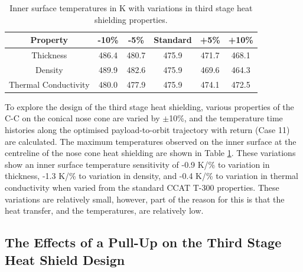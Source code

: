 \begin{table}[!ht]
	\centering
	\begin{tabular}{|c|c|c|c|c|c|}
		\hline Property & -10\% & -5\% & Standard & +5\% & +10\% \\ 
		\hline Thickness & 486.4 & 480.7 & 475.9 &  471.7 & 468.1  \\ 
		\hline Density &  489.9 & 482.6 & 475.9 & 469.6 &  464.3\\ 
		\hline Thermal Conductivity & 480.0 & 477.9 & 475.9 & 474.1 & 472.5 \\ 
		\hline 
	\end{tabular} 
	
	\caption{Inner surface temperatures in K with variations in third stage heat shielding properties.}
	\label{tab:tpsthirdstage}
\end{table}

To explore the design of the third stage heat shielding, various properties of the C-C on the conical nose cone are varied by $\pm$10\%, and the temperature time histories along the optimised payload-to-orbit trajectory with return (Case 11) are calculated. The maximum temperatures observed on the inner surface at the centreline of the nose cone heat shielding are shown in Table \ref{tab:tpsthirdstage}. These variations show an inner surface temperature sensitivity of -0.9 K/\% to variation in thickness, -1.3 K/\% to variation in density, and -0.4 K/\% to variation in thermal conductivity when varied from the standard CCAT T-300 properties. These variations are relatively small, however, part of the reason for this is that the heat transfer, and the temperatures, are relatively low. 






\subsection{The Effects of a Pull-Up on the Third Stage Heat Shield Design}\label{sec:TPSredesign}


